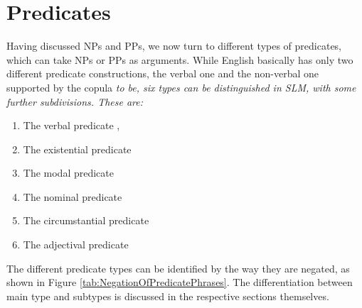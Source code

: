  \chapter{Predicates}\label{sec:pred}
Having discussed NPs and PPs, we now turn to different types of  predicates, which can take NPs or PPs as arguments.
While English basically has only two different predicate constructions, the verbal one and the non-verbal one supported by the copula \em to be\em, six types can be distinguished in SLM, with some further subdivisions. These are:

\begin{enumerate}
	\item The verbal predicate ,
	\item The existential predicate 
	\item The modal predicate 
	\item The nominal predicate 
	\item The circumstantial predicate 
	\item The adjectival predicate 
\end{enumerate}

The different predicate types can be identified by the way they are negated, as shown in Figure \ref{tab:NegationOfPredicatePhrases}. The differentiation between main type and subtypes is discussed in the respective sections themselves.

